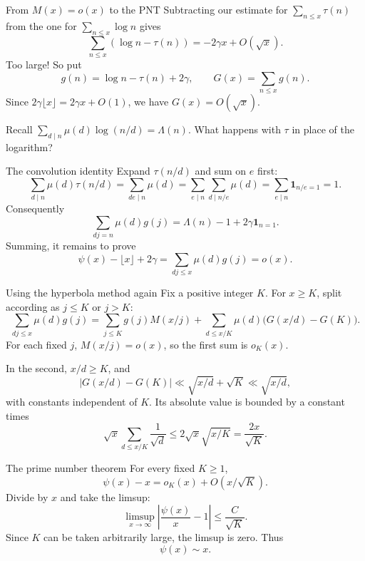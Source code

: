 \documentclass[aspectratio=169,11pt]{beamer}
\newcommand{\ind}{\mathbf1}
\begin{document}
\begin{frame}{From $M(x)=o(x)$ to the PNT}
Subtracting our estimate for $\sum_{n\le x}\tau(n)$ from the one for $\sum_{n\le x}\log n$ gives
\[\sum_{n\le x}(\log n-\tau(n))=-2\gamma x+O(\sqrt x).\]
Too large! So put
\[g(n)=\log n-\tau(n)+2\gamma,\qquad G(x)=\sum_{n\le x}g(n).\]
Since $2\gamma\lfloor x\rfloor=2\gamma x+O(1)$, we have $G(x)=O(\sqrt x)$.

Recall $\sum_{d\mid n}\mu(d)\log(n/d)=\Lambda(n)$. What happens with $\tau$ in place of the logarithm?
\end{frame}
\begin{frame}{The convolution identity}
Expand $\tau(n/d)$ and sum on $e$ first:
\[\sum_{d\mid n}\mu(d)\tau(n/d)=\sum_{de\mid n}\mu(d)
=\sum_{e\mid n}\sum_{d\mid n/e}\mu(d)=\sum_{e\mid n}\ind_{n/e=1}=1.\]
Consequently
\[\sum_{dj=n}\mu(d)g(j)=\Lambda(n)-1+2\gamma\ind_{n=1}.\]
Summing, it remains to prove
\[\psi(x)-\lfloor x\rfloor+2\gamma=\sum_{dj\le x}\mu(d)g(j)=o(x).\]
\end{frame}
\begin{frame}{Using the hyperbola method again}
\small
Fix a positive integer $K$. For $x\ge K$, split according as $j\le K$ or $j>K$:
\[\sum_{dj\le x}\mu(d)g(j)=\sum_{j\le K}g(j)M(x/j)
+\sum_{d\le x/K}\mu(d)\bigl(G(x/d)-G(K)\bigr).\]
For each fixed $j$, $M(x/j)=o(x)$, so the first sum is $o_K(x)$.

In the second, $x/d\ge K$, and
\[|G(x/d)-G(K)|\ll\sqrt{x/d}+\sqrt K\ll\sqrt{x/d},\]
with constants independent of $K$. Its absolute value is bounded by a constant times
\[\sqrt x\sum_{d\le x/K}\frac1{\sqrt d}\le2\sqrt x\sqrt{x/K}=\frac{2x}{\sqrt K}.\]
\end{frame}
\begin{frame}{The prime number theorem}
For every fixed $K\ge1$,
\[\psi(x)-x=o_K(x)+O(x/\sqrt K).\]
Divide by $x$ and take the limsup:
\[\limsup_{x\to\infty}\left|\frac{\psi(x)}x-1\right|\le\frac C{\sqrt K}.\]
Since $K$ can be taken arbitrarily large, the limsup is zero. Thus
\[\boxed{\psi(x)\sim x.}\]
\end{frame}


\end{document}
